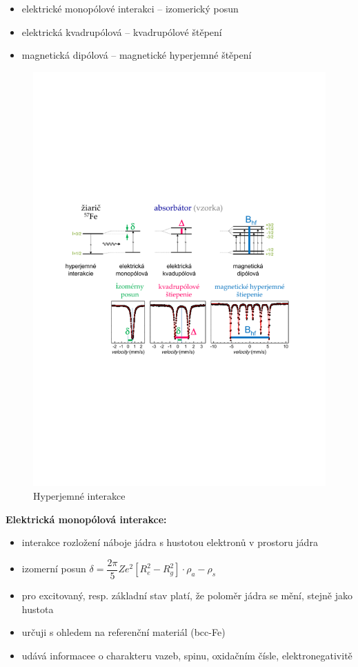 \begin{itemize}
   \item elektrické monopólové interakci -- izomerický posun
   \item elektrická kvadrupólová -- kvadrupólové štěpení
   \item magnetická dipólová -- magnetické hyperjemné štěpení
\end{itemize}

\begin{figure}[H]
   \centering
   \includegraphics[width=0.8\linewidth, trim={2cm 10cm 2cm 10cm}, clip]{img/mossbauer_interactions.pdf}
   \caption{Hyperjemné interakce}
   \label{fig:6_2_mossbauer_hyperjemne_interakce}
\end{figure}

\textbf{Elektrická monopólová interakce:}

\begin{itemize}
\item interakce rozložení náboje jádra s hustotou elektronů v prostoru jádra 
\item izomerní posun $\delta = \dfrac{2\pi}{5} Ze^2 [R_e^2 - R_g^2] \cdot {\rho_a - \rho_s}$
\item pro excitovaný, resp. základní stav platí, že poloměr jádra se mění, stejně jako hustota
\item určuji s ohledem na referenční materiál (bcc-Fe)
\item udává informacee o charakteru vazeb, spinu, oxidačním čísle, elektronegativitě
\end{itemize}

